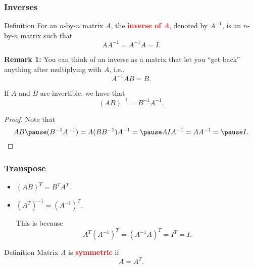 \begin{frame}
  \frametitle{Inverses}

  \begin{block}{Definition}
    For an $n$-by-$n$ matrix $A$, the \textcolor{red}{\bf inverse of
      $A$}, denoted by $A^{-1}$, is an $n$-by-$n$ matrix such that
    \[
    AA^{-1}=A^{-1}A=I.
    \]
  \end{block}

  {\small

    {\bf Remark 1:} You can think of an inverse as a matrix that let
    you ``get back'' anything after multiplying with $A$, i.e.,
    \[
    A^{-1}AB = B.
    \]
    
  
  }
\end{frame}

\begin{frame}
  \begin{lemma}
    If $A$ and $B$ are invertible, we have that
    \[
    (AB)^{-1} = B^{-1}A^{-1}.
    \]
  \end{lemma}
  
  \begin{proof}
    Note that
    \[
    AB \pause (B^{-1}A^{-1}) =
    A(BB^{-1})A^{-1} =
    \pause
    AIA^{-1} = AA^{-1} =
    \pause
    I.
    \]
  \end{proof}
\end{frame}

\begin{frame}
  \frametitle{Transpose}
  \begin{itemize}
  \item $(AB)^T=B^TA^T$.
  \item $(A^T)^{-1}=(A^{-1})^T$.
    \pause

    This is because
    \[
    A^T(A^{-1})^T=(A^{-1}A)^T=I^T=I.
    \]
  \end{itemize}

  \pause
  \begin{block}{Definition}
    Matrix $A$ is \textcolor{red}{\bf symmetric} if
    \[
    A=A^T.
    \]
  \end{block}
\end{frame}

